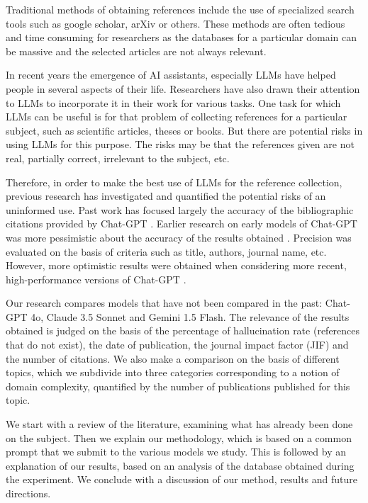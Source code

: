 \documentclass[runningheads]{llncs}
\begin{document}
Traditional methods of obtaining references include the use of specialized search tools such as google scholar, arXiv or others.
These methods are often tedious and time consuming for researchers as the databases for a particular domain can be massive and the selected articles are not always relevant.

In recent years the emergence of AI assistants, especially LLMs have helped people in several aspects of their life. Researchers have also drawn their attention to LLMs to incorporate it in their work for various tasks. 
One task for which LLMs can be useful is for that problem of collecting references for a particular subject, such as scientific articles, theses or books.
But there are potential risks in using LLMs for this purpose. The risks may be that the references given are not real, partially correct, irrelevant to the subject, etc.

Therefore, in order to make the best use of LLMs for the reference collection, previous research has investigated and quantified the potential risks of an uninformed use.
Past work has focused largely the accuracy of the bibliographic citations provided by Chat-GPT \cite{Chat-GPT2024}.
Earlier research on early models of Chat-GPT was more pessimistic about the accuracy of the results obtained \cite{day2023}. Precision was evaluated on the basis of criteria such as title, authors, journal name, etc.
However, more optimistic results were obtained when considering more recent, high-performance versions of Chat-GPT \cite{byun-etal-2024-reference,walters_2023}.

Our research compares models that have not been compared in the past: Chat-GPT 4o, Claude 3.5 Sonnet and Gemini 1.5 Flash. The relevance of the results obtained is judged on the basis of the percentage of hallucination rate (references that do not exist), the date of publication, the journal impact factor (JIF) and the number of citations.
 We also make a comparison on the basis of different topics, which we subdivide into three categories corresponding to a notion of domain complexity, quantified by the number of publications published for this topic.

We start with a review of the literature, examining what has already been done on the subject. Then we explain our methodology, which is based on a common prompt that we submit to the various models we study. This is followed by an explanation of our results, based on an analysis of the database obtained during the experiment. We conclude with a discussion of our method, results and future directions.
\end{document}
